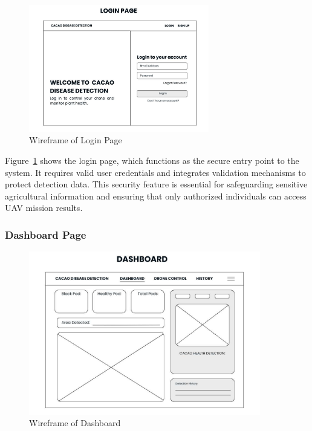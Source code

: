 \begin{figure}[H]
	\centering
	\caption{Wireframe of Login Page}
	\label{fig:LoginGUI}
	\includegraphics[width=0.7\textwidth]{figures/Login.pdf}
\end{figure}

Figure~\ref{fig:LoginGUI} shows the login page, which functions as the secure entry point to the system. It requires valid user credentials and integrates validation mechanisms to protect detection data. This security feature is essential for safeguarding sensitive agricultural information and ensuring that only authorized individuals can access UAV mission results.

\subsubsection*{Dashboard Page}

\begin{figure}[H]
	\centering
	\caption{Wireframe of Dashboard}
	\label{fig:DashboardGUI}
	\includegraphics[width=0.9\textwidth]{figures/Dashboard.pdf}
\end{figure}

